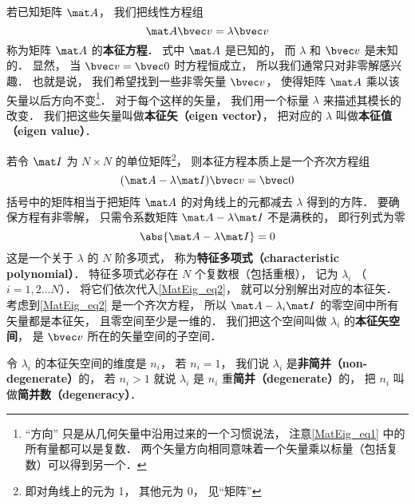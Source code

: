 

若已知矩阵 $\mat A$， 我们把线性方程组
\begin{equation}\label{MatEig_eq1}
\mat A \bvec v = \lambda \bvec v
\end{equation}
称为矩阵 $\mat A$ 的\textbf{本征方程}． 式中 $\mat A$ 是已知的， 而 $\lambda$ 和 $\bvec v$ 是未知的． 显然， 当 $\bvec v = \bvec 0$ 时方程恒成立， 所以我们通常只对非零解感兴趣． 也就是说， 我们希望找到一些非零矢量 $\bvec v$， 使得矩阵 $\mat A$ 乘以该矢量以后方向不变\footnote{“方向” 只是从几何矢量中沿用过来的一个习惯说法， 注意\autoref{MatEig_eq1} 中的所有量都可以是复数． 两个矢量方向相同意味着一个矢量乘以标量（包括复数）可以得到另一个．}． 对于每个这样的矢量， 我们用一个标量 $\lambda$ 来描述其模长的改变． 我们把这些矢量叫做\textbf{本征矢（eigen vector）}， 把对应的 $\lambda$ 叫做\textbf{本征值（eigen value）}．

若令 $\mat I$ 为 $N\times N$ 的单位矩阵\footnote{即对角线上的元为 1， 其他元为 0， 见“矩阵”}， 则本征方程本质上是一个齐次方程组
\begin{equation}\label{MatEig_eq2}
(\mat A - \lambda\mat I)\bvec v = \bvec 0
\end{equation}
括号中的矩阵相当于把矩阵 $\mat A$ 的对角线上的元都减去 $\lambda$ 得到的方阵． 要确保方程有非零解， 只需令系数矩阵 $\mat A - \lambda\mat I$ 不是满秩的， 即行列式为零
\begin{equation}
\abs{\mat A - \lambda\mat I} = 0
\end{equation}
这是一个关于 $\lambda$ 的 $N$ 阶多项式， 称为\textbf{特征多项式（characteristic polynomial）}． 特征多项式必存在 $N$ 个复数根（包括重根），%
记为 $\lambda_i$ （$i = 1, 2\dots N$）． 将它们依次代入\autoref{MatEig_eq2}， 就可以分别解出对应的本征矢． 考虑到\autoref{MatEig_eq2} 是一个齐次方程， 所以 $\mat A - \lambda_i\mat I$ 的零空间中所有矢量都是本征矢， 且零空间至少是一维的． 我们把这个空间叫做 $\lambda_i$ 的\textbf{本征矢空间}， 是 $\bvec v$ 所在的矢量空间的子空间．

令 $\lambda_i$ 的本征矢空间的维度是 $n_i$， 若 $n_i = 1$， 我们说 $\lambda_i$ 是\textbf{非简并（non-degenerate）}的， 若 $n_i > 1$ 就说 $\lambda_i$ 是 $n_i$ 重\textbf{简并（degenerate）}的， 把 $n_i$ 叫做\textbf{简并数（degeneracy）}．

